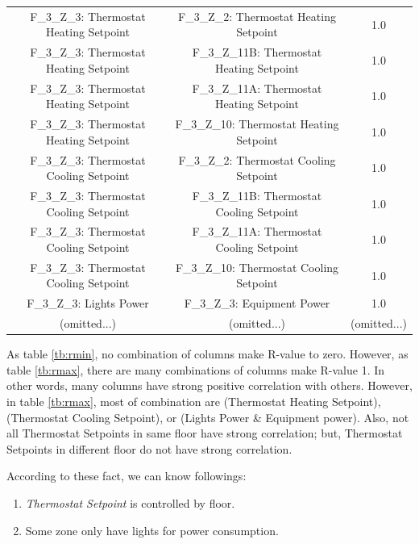 \documentclass[aps, 10pt, a4paper]{article}
\begin{document}
\begin{table}[htbp]
\begin{tabular}{c|c||c}
                        F\_3\_Z\_3: Thermostat Heating Setpoint & F\_3\_Z\_2: Thermostat Heating Setpoint & 1.0 \\
                        F\_3\_Z\_3: Thermostat Heating Setpoint & F\_3\_Z\_11B: Thermostat Heating Setpoint & 1.0 \\
                        F\_3\_Z\_3: Thermostat Heating Setpoint & F\_3\_Z\_11A: Thermostat Heating Setpoint & 1.0 \\
                        F\_3\_Z\_3: Thermostat Heating Setpoint & F\_3\_Z\_10: Thermostat Heating Setpoint & 1.0 \\
                        F\_3\_Z\_3: Thermostat Cooling Setpoint & F\_3\_Z\_2: Thermostat Cooling Setpoint & 1.0 \\
                        F\_3\_Z\_3: Thermostat Cooling Setpoint & F\_3\_Z\_11B: Thermostat Cooling Setpoint & 1.0 \\
                        F\_3\_Z\_3: Thermostat Cooling Setpoint & F\_3\_Z\_11A: Thermostat Cooling Setpoint & 1.0 \\
                        F\_3\_Z\_3: Thermostat Cooling Setpoint & F\_3\_Z\_10: Thermostat Cooling Setpoint & 1.0 \\
                        F\_3\_Z\_3: Lights Power & F\_3\_Z\_3: Equipment Power & 1.0 \\
                        (omitted...) & (omitted...) &  (omitted...) \\
                    \end{tabular}
                \end{table}
                
                As table \ref{tb:rmin}, no combination of columns make R-value to zero. However, as table \ref{tb:rmax}, there are many combinations of columns make R-value 1. In other words, many columns have strong positive correlation with others. However, in table \ref{tb:rmax}, most of combination are (Thermostat Heating Setpoint), (Thermostat Cooling Setpoint), or (Lights Power \& Equipment power). Also, not all Thermostat Setpoints in same floor have strong correlation; but, Thermostat Setpoints in different floor do not have strong correlation. 
                
                According to these fact, we can know followings:
                \begin{enumerate}
                    \item \textit{Thermostat Setpoint} is controlled by floor.
                    \item Some zone only have lights for power consumption. 
                \end{enumerate}
                
\end{document}
